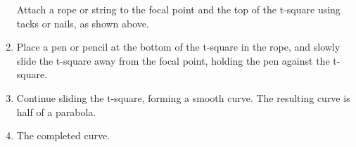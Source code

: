 \documentclass{article}
\begin{document}
\begin{enumerate}
\begin{minipage}[t]{\linewidth}
                \medskip
                Attach a rope or string to the focal point and the top of the t-square using tacks or nails, as shown above.
            \end{minipage}
            \item \begin{minipage}[t]{\linewidth}
                \raggedright

                \medskip
                Place a pen or pencil at the bottom of the t-square in the rope, and slowly slide the t-square away from the focal point, 
                holding the pen against the t-square.  
                \end{minipage}
            \item \begin{minipage}[t]{\linewidth}
                \raggedright

                \medskip
                Continue sliding the t-square, forming a smooth curve.  The resulting curve is half of a parabola.
            \end{minipage}
            \item \begin{minipage}[t]{\linewidth}
                \raggedright

                \medskip
                The completed curve.
            \end{minipage}
        \end{enumerate}
    \newpage
    \printglossary
    \printbibliography
\end{document}
